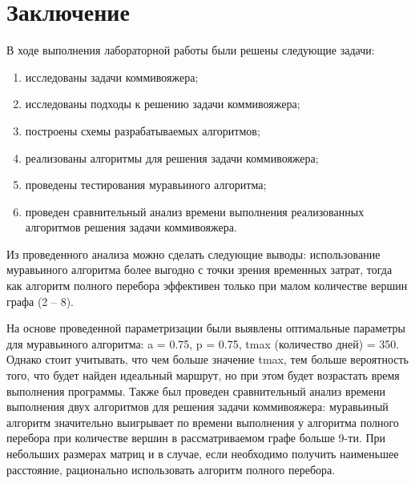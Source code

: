 \chapter*{Заключение}

В ходе выполнения лабораторной работы были решены следующие задачи:

\begin{enumerate}
	\item исследованы задачи коммивояжера;
	\item исследованы подходы к решению задачи коммивояжера;
	\item построены схемы разрабатываемых алгоритмов; 
	\item реализованы алгоритмы для решения задачи коммивояжера;
	\item проведены тестирования муравьиного алгоритма;
	\item проведен сравнительный анализ времени выполнения реализованных алгоритмов решения задачи коммивояжера. 
\end{enumerate}

Из проведенного анализа можно сделать следующие выводы: использование муравьиного алгоритма более выгодно с точки зрения временных затрат, тогда как алгоритм полного перебора эффективен только при малом количестве вершин графа (2 -- 8). 


На основе проведенной параметризации были выявлены оптимальные параметры для муравьиного алгоритма: a = 0.75, p = 0.75, tmax (количество дней) = 350. Однако стоит учитывать, что чем больше значение tmax, тем больше вероятность того, что будет найден идеальный маршрут, но при этом будет возрастать время выполнения программы. Также был проведен сравнительный анализ времени выполнения двух алгоритмов для решения задачи коммивояжера: муравьиный алгоритм значительно выигрывает по времени выполнения у алгоритма полного перебора при количестве вершин в рассматриваемом графе больше 9-ти. При небольших размерах матриц и в случае, если необходимо получить наименьшее
расстояние, рационально использовать алгоритм полного перебора.